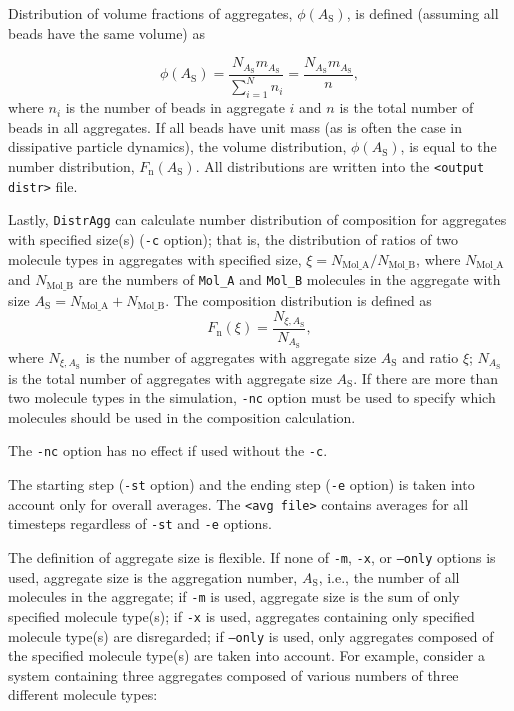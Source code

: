 Distribution of volume fractions of aggregates, $\phi(A_{\text{S}})$, is
defined (assuming all beads have the same volume) as

\begin{equation} \label{eq:Fvol}
  \phi(A_{\text{S}}) = \frac{N_{A_{\text{S}} } m_{A_{\text{S}} }}{\sum_{i=1}^N n_i} =
  \frac{N_{A_{\text{S}} } m_{A_{\text{S}} }}{n},
\end{equation}
where $n_i$ is the number of beads in aggregate $i$ and $n$ is the total
number of beads in all aggregates. If all beads have unit mass (as is often
the case in dissipative particle dynamics), the volume distribution,
$\phi(A_{\text{S}})$, is equal to the number distribution,
$F_{\text{n}}(A_{\text{S}})$.
All distributions are written into the \texttt{<output distr>} file.

Lastly, \texttt{DistrAgg} can calculate number distribution of composition
for aggregates with specified size(s) (\texttt{-c} option); that is, the
distribution of ratios of two molecule types in aggregates with specified
size, $\xi=N_{\text{Mol\_A}}/N_{\text{Mol\_B}}$, where $N_{\text{Mol\_A}}$
and $N_{\text{Mol\_B}}$ are the numbers of \texttt{Mol\_A} and
\texttt{Mol\_B} molecules in the aggregate with size
$A_{\text{S}}=N_{\text{Mol\_A}}+N_{\text{Mol\_B}}$.  The composition
distribution is defined as
\begin{equation} \label{eq:CompDistr}
  F_{\text{n}}(\xi) = \frac{N_{\xi,A_{\text{S}} }}{N_{A_{\text{S}}} },
\end{equation}
where $N_{\xi,A_{\text{S}} }$ is the number of aggregates with aggregate
size $A_{\text{S}}$ and ratio $\xi$; $N_{A_{\text{S}}}$ is the total
number of aggregates with aggregate size $A_{\text{S}}$.
If there are more than two molecule types in the simulation, \texttt{-nc}
option must be used to specify which molecules should be used in the
composition calculation.

The \texttt{-nc} option has no effect if used without the \texttt{-c}.

The starting step (\texttt{-st} option) and the ending step (\texttt{-e}
option) is taken into account only for overall averages. The \texttt{<avg
file>} contains averages for all timesteps regardless of \texttt{-st} and
\texttt{-e} options.

The definition of aggregate size is flexible. If none of \texttt{-m},
\texttt{-x}, or \texttt{--only} options is used, aggregate size is the
 aggregation number, $A_{\text{S}}$, i.e., the number of all
molecules in the aggregate; if \texttt{-m} is used, aggregate size is the
sum of only specified molecule type(s); if \texttt{-x} is used, aggregates
containing only specified molecule type(s) are disregarded; if
\texttt{--only} is used, only aggregates composed of the specified molecule
type(s) are taken into account. For example, consider a system containing
three aggregates composed of various numbers of three different molecule
types:

